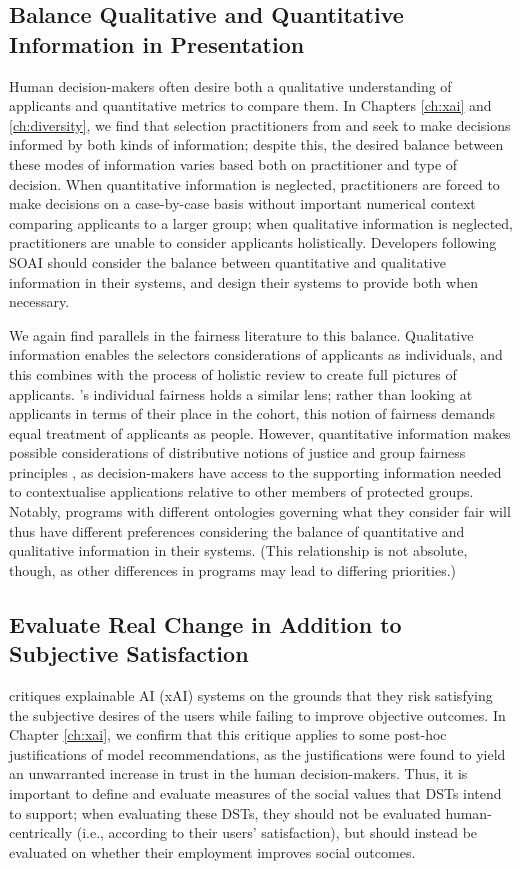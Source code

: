 \subsection{Balance Qualitative and Quantitative Information in Presentation}
Human decision-makers often desire both a qualitative understanding of applicants and quantitative metrics to compare them. In Chapters \ref{ch:xai} and \ref{ch:diversity}, we find that selection practitioners from \rise and \eit seek to make decisions informed by both kinds of information; despite this, the desired balance between these modes of information varies based both on practitioner and type of decision. When quantitative information is neglected, practitioners are forced to make decisions on a case-by-case basis without important numerical context comparing applicants to a larger group; when qualitative information is neglected, practitioners are unable to consider applicants holistically. Developers following SOAI should consider the balance between quantitative and qualitative information in their systems, and design their systems to provide both when necessary.

We again find parallels in the fairness literature to this balance. Qualitative information enables the selectors considerations of applicants as individuals, and this combines with the process of holistic review to create full pictures of applicants. \cite{dwork_fairness_2012}'s individual fairness holds a similar lens; rather than looking at applicants in terms of their place in the cohort, this notion of fairness demands equal treatment of applicants as people. However, quantitative information makes possible considerations of distributive notions of justice and group fairness principles \cite{Olsaretti_2018}, as decision-makers have access to the supporting information needed to contextualise applications relative to other members of protected groups. Notably, programs with different ontologies governing what they consider fair will thus have different preferences considering the balance of quantitative and qualitative information in their systems. (This relationship is not absolute, though, as other differences in programs may lead to differing priorities.)

\subsection{Evaluate Real Change in Addition to Subjective Satisfaction}\label{ssec:real_change}
\textcite{Lipton} critiques explainable AI (xAI) systems on the grounds that they risk satisfying the subjective desires of the users while failing to improve objective outcomes. In Chapter \ref{ch:xai}, we confirm that this critique applies to some post-hoc justifications of model recommendations, as the justifications were found to yield an unwarranted increase in trust in the human decision-makers. Thus, it is important to define and evaluate measures of the social values that DSTs intend to support; when evaluating these DSTs, they should not be evaluated human-centrically (i.e., according to their users' satisfaction), but should instead be evaluated on whether their employment improves social outcomes.

